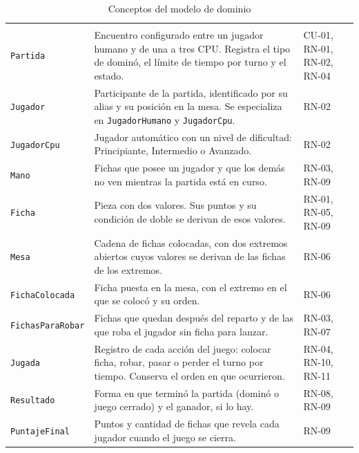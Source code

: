 {\tablacompacta
\begin{longtable}{@{}L{3.2cm}L{8.4cm}L{2.9cm}@{}}
  \caption{Conceptos del modelo de dominio}\label{tab:conceptos}\\
  \toprule
   &  &  \\ \midrule \endfirsthead
  \toprule
   &  &  \\ \midrule \endhead
  \bottomrule \endlastfoot
  \texttt{Partida} & Encuentro configurado entre un jugador humano y de una a tres CPU. Registra el tipo de dominó, el límite de tiempo por turno y el estado. & CU-01, RN-01, RN-02, RN-04 \\ \filasep
  \texttt{Jugador} & Participante de la partida, identificado por su alias y su posición en la mesa. Se especializa en \texttt{JugadorHumano} y \texttt{JugadorCpu}. & RN-02 \\ \filasep
  \texttt{JugadorCpu} & Jugador automático con un nivel de dificultad: Principiante, Intermedio o Avanzado. & RN-02 \\ \filasep
  \texttt{Mano} & Fichas que posee un jugador y que los demás no ven mientras la partida está en curso. & RN-03, RN-09 \\ \filasep
  \texttt{Ficha} & Pieza con dos valores. Sus puntos y su condición de doble se derivan de esos valores. & RN-01, RN-05, RN-09 \\ \filasep
  \texttt{Mesa} & Cadena de fichas colocadas, con dos extremos abiertos cuyos valores se derivan de las fichas de los extremos. & RN-06 \\ \filasep
  \texttt{FichaColocada} & Ficha puesta en la mesa, con el extremo en el que se colocó y su orden. & RN-06 \\ \filasep
  \texttt{FichasParaRobar} & Fichas que quedan después del reparto y de las que roba el jugador sin ficha para lanzar. & RN-03, RN-07 \\ \filasep
  \texttt{Jugada} & Registro de cada acción del juego: colocar ficha, robar, pasar o perder el turno por tiempo. Conserva el orden en que ocurrieron. & RN-04, RN-10, RN-11 \\ \filasep
  \texttt{Resultado} & Forma en que terminó la partida (dominó o juego cerrado) y el ganador, si lo hay. & RN-08, RN-09 \\ \filasep
  \texttt{PuntajeFinal} & Puntos y cantidad de fichas que revela cada jugador cuando el juego se cierra. & RN-09 \\
\end{longtable}}

